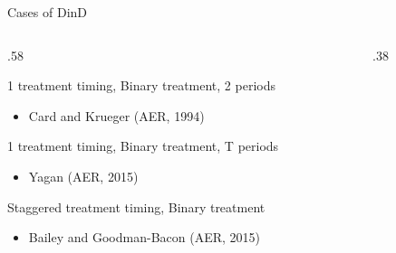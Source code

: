 \documentclass[notes,11pt, aspectratio=169]{beamer}
\newenvironment{wideitemize}{\itemize\addtolength{\itemsep}{10pt}}{\enditemize}
\begin{document}
\begin{frame}{Cases of DinD}
	\begin{columns}[T] %
		\begin{column}{.58\textwidth}
			\begin{wideitemize}
				\item 1 treatment timing, Binary treatment, 2 periods
				\begin{itemize}
					\item Card and Krueger  (AER, 1994)
				\end{itemize}
				\item 1 treatment timing, Binary treatment, T periods
				\begin{itemize}
					\item Yagan (AER, 2015)
				\end{itemize}
				\item Staggered treatment timing, Binary treatment
				\begin{itemize}
					\item Bailey and Goodman-Bacon (AER, 2015)
				\end{itemize}
			\end{wideitemize}
		\end{column}%
		\hfill%
		\begin{column}{.38\textwidth}
		\end{column}%
	\end{columns}
\end{frame}
\end{document}
